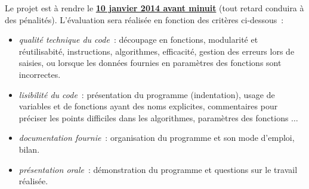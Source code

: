 \documentclass[10pt]{article}
\begin{document}
Le projet est à rendre le \underline{\bf 10 janvier 2014 avant minuit} 
(tout retard conduira à des pénalités). L'évaluation sera réalisée en fonction 
des critères ci-dessous~:
\begin{itemize}

\item  \textit{qualité technique du code}~: découpage en fonctions, modularité et réutilisabité, instructions, algorithmes, efficacité, gestion des erreurs lors de saisies, ou lorsque les données fournies en paramètres des fonctions sont incorrectes.

\item \textit{lisibilité du code}~: présentation du programme (indentation), usage de variables et de fonctions ayant des noms explicites, commentaires pour préciser les points difficiles dans les algorithmes, paramètres des fonctions $\ldots$ 

\item \textit{documentation fournie}~: organisation du programme et son mode d'emploi, bilan.

\item \textit{présentation orale}~: démonstration du programme et questions sur le travail réalisée.

\end{itemize}
\end{document}
